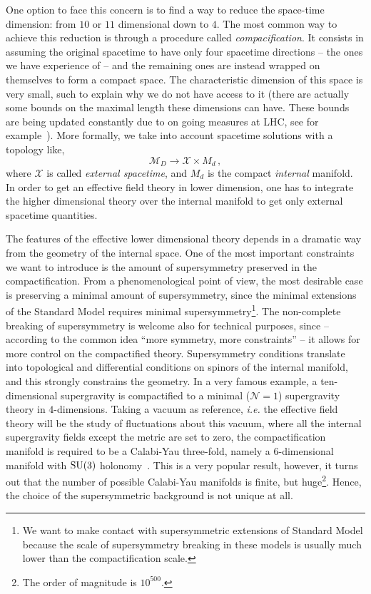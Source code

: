 \documentclass[draft]{phd}
\begin{document}
		One option to face this concern is to find a way to reduce the space-time dimension: from $10$ or $11$ dimensional down to $4$.
		The most common way to achieve this reduction is through a procedure called \emph{compacification}.
		It consists in assuming the original spacetime to have only four spacetime directions -- the ones we have experience of -- and the remaining ones are instead wrapped on themselves to form a compact space.
		The characteristic dimension of this space is very small, such to explain why we do not have access to it (there are actually some bounds on the maximal length these dimensions can have. These bounds are being updated constantly due to on going measures at LHC, see for example~\cite{extradim1,extradim2}).
		More formally, we take into account spacetime solutions with a topology like,
				\begin{equation*}
					\mathcal{M}_D \rightarrow \mathcal{X} \times M_d\, ,
				\end{equation*}
		where $\mathcal{X}$ is called \emph{external spacetime}, and $M_d$ is the compact \emph{internal} manifold.
		In order to get an effective field theory in lower dimension, one has to integrate the higher dimensional theory over the internal manifold to get only external spacetime quantities.
		
		The features of the effective lower dimensional theory depends in a dramatic way from the geometry of the internal space.
		One of the most important constraints we want to introduce is the amount of supersymmetry preserved in the compactification.
		From a phenomenological point of view, the most desirable case is preserving a minimal amount of supersymmetry, since the minimal extensions of the Standard Model requires minimal supersymmetry\footnote{%
			We want to make contact with supersymmetric extensions of Standard Model because the scale of supersymmetry breaking in these models is usually much lower than the compactification scale.}.
		The non-complete breaking of supersymmetry is welcome also for technical purposes, since -- according to the common idea ``more symmetry, more constraints'' -- it allows for more control on the compactified theory.
		Supersymmetry conditions translate into topological and differential conditions on spinors of the internal manifold, and this strongly constrains the geometry.
		In a very famous example, a ten-dimensional supergravity is compactified to a minimal ($\mathcal{N}=1$) supergravity theory in $4$-dimensions. Taking a vacuum as reference, \emph{i.e.} the effective field theory will be the study of fluctuations about this vacuum, where all the internal supergravity fields except the metric are set to zero, the compactification manifold is required to be a Calabi-Yau three-fold, namely a $6$-dimensional manifold with $\mathrm{SU}(3)$ holonomy~\cite{CYcomp}.
		This is a very popular result, however, it turns out that the number of possible Calabi-Yau manifolds is finite, but huge\footnote{%
			The order of magnitude is $10^{500}$.}. 
		Hence, the choice of the supersymmetric background is not unique at all.
		
\end{document}
